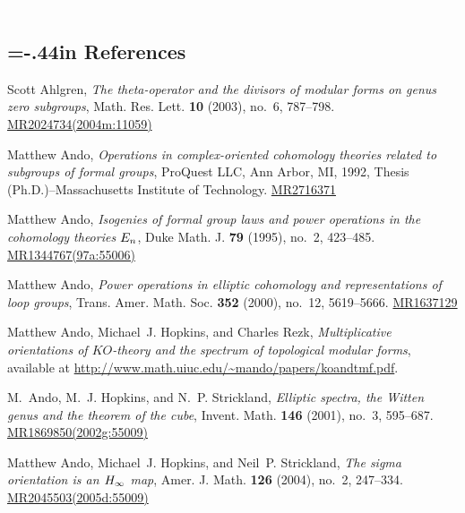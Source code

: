 \documentclass{gtpart}
\theoremstyle{definition}
\theoremstyle{remark}
\renewcommand{\=}{\approx}
\renewcommand{\-}{\sim}
\newcommand{\wt}[1]{\textcolor{white}{#1} \!~}
\numberwithin{equation}{section}
\begin{document}
% 
% 

\renewcommand\refname{}
\newcommand{\AX}[1]{\href{http://arxiv.org/abs/#1}{arXiv:#1}}
\newcommand{\MRn}[2]{\href{http://www.ams.org/mathscinet-getitem?mr=#1}{MR#1#2}}
\newcommand{\name}{TateNormalLevelResolutions.pdf}
\wt{.}\vspace{-1.04in}
\begin{thebibliography}

\section*{\leftskip=-.44in References \vspace{.17in}}

Scott Ahlgren, \emph{The theta-operator and the divisors of modular forms on
  genus zero subgroups}, Math. Res. Lett. \textbf{10} (2003), no.~6,
  787--798. \MRn{2024734}{(2004m:11059)}

Matthew Ando, \emph{Operations in complex-oriented cohomology theories related
  to subgroups of formal groups}, ProQuest LLC, Ann Arbor, MI, 1992, Thesis
  (Ph.D.)--Massachusetts Institute of Technology. \MRn{2716371}{}

Matthew Ando, \emph{Isogenies of formal group laws and power operations in the
  cohomology theories {$E\sb n$}}, Duke Math. J. \textbf{79} (1995), no.~2,
  423--485. \MRn{1344767}{(97a:55006)}

Matthew Ando, \emph{Power operations in elliptic cohomology and representations 
  of loop groups}, Trans. Amer. Math. Soc. \textbf{352} (2000), no.~12,
  5619--5666. \MRn{1637129}{}

Matthew Ando, Michael~J. Hopkins, and Charles Rezk, \emph{Multiplicative
  orientations of {$KO$}-theory and the spectrum of topological modular forms}, 
  available at \href{http://www.math.uiuc.edu/~mando/papers/koandtmf.pdf}
  {http://www.math.uiuc.edu/\textasciitilde mando/papers/koandtmf.pdf}.

M.~Ando, M.~J. Hopkins, and N.~P. Strickland, \emph{Elliptic spectra, the
  {W}itten genus and the theorem of the cube}, Invent. Math. \textbf{146}
  (2001), no.~3, 595--687. \MRn{1869850}{(2002g:55009)}

Matthew Ando, Michael~J. Hopkins, and Neil~P. Strickland, \emph{The sigma
  orientation is an {$H\sb \infty$} map}, Amer. J. Math. \textbf{126} (2004),
  no.~2, 247--334. \MRn{2045503}{(2005d:55009)}


\end{thebibliography}
\end{document}
